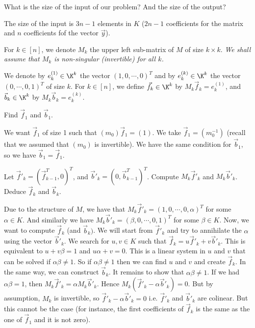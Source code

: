 \documentclass[11pt]{exam}
\theoremstyle{definition}
\begin{document}
{\begin{questions}
	\question What is the size of the input of our problem? And the size of the output?
	
	\begin{solution}
		The size of the input is $3n-1$ elements in $K$ ($2n-1$ coefficients for the matrix and $n$ coefficients fof the vector $\vec{y}$).
	\end{solution}
	
	For $k \in [n]$, we denote $M_k$ the upper left sub-matrix of $M$
	of size $k \times k$.
	\emph{We shall assume that $M_k$ is non-singular
		(invertible) for all $k$.}
	
	We denote by $e_k^{(1)} \in \K^k$ the vector $(1,0,
	\cdots, 0)^T$ and by $e_k^{(k)}\in \K^k$ the vector $(0, \cdots, 0,1)^T$
	of size $k$. For $k \in [n]$, we define $\vec{f}_k \in \K^k$ by $M_k \vec{f}_k = e_k^{(1)}$,
	and $\vec{b}_k \in \K^k$ by $M_k \vec{b}_k = e_k^{(k)}$.
	
	
	\question Find $\vec{f}_1$ and $\vec{b}_1$.
	
	\begin{solution}
		We want $\vec{f}_1$ of size 1 such that $(m_0) \vec{f}_1 = (1)$. We take $\vec{f}_1 = (m_0^{-1})$ (recall that we assumed that $(m_0)$ is invertible).
		We have the same condition for $\vec{b}_1$, so we have $\vec{b}_1 = \vec{f}_1$.
	\end{solution}
	
	\question Let $\vec{f}'_k = ( \vec{f}^T_{k-1}, 0)^T$, and $\vec{b}'_k = ( 0, \vec{b}_{k-1}^T)^T$. Compute $M_k \vec{f}'_k$  and $M_k \vec{b}'_k$. Deduce $\vec{f}_k$ and $\vec{b}_k$.
	\begin{solution}
		Due to the structure of $M$, we have that $M_k \vec{f}'_k = (1,0,\cdots, 0,\alpha)^T$ for some $\alpha \in K$. And similarly we have $M_k \vec{b}'_k = (\beta,0,\cdots, 0,1)^T$ for some $\beta \in K$. Now, we want to compute $\vec{f}_k$ (and $\vec{b}_k)$. We will start from $\vec{f}'_k$ and try to annihilate the $\alpha$ using the vector $\vec{b}'_k$. We search for $u,v \in K$ such that $\vec{f}_k = u\vec{f}'_k + v\vec{b}'_k$. This is equivalent to $u + v \beta = 1$ and $u \alpha + v = 0$. This is a linear system in $u$ and $v$ that can be solved if $\alpha \beta \neq 1$. So if $\alpha \beta \neq 1$ then we can find $u$ and $v$ and create $\vec{f}_k$. In the same way, we can construct $\vec{b}_k$. It remains to show that $\alpha \beta \neq 1$. If we had $\alpha \beta = 1$, then $M_k \vec{f}'_k = \alpha M_k \vec{b}'_k$. Hence $M_k (\vec{f}'_k-\alpha \vec{b}'_k) = 0$. But by assumption, $M_k$ is invertible, so $\vec{f}'_k-\alpha \vec{b}'_k = 0$ i.e. $\vec{f}'_k$ and $\vec{b}'_k$ are colinear. But this cannot be the case (for instance, the first coefficients of $\vec{f}_k$ is the same as the one of $\vec{f}_1$ and it is not zero).
	\end{solution}
	

\end{questions}}
\end{document}
